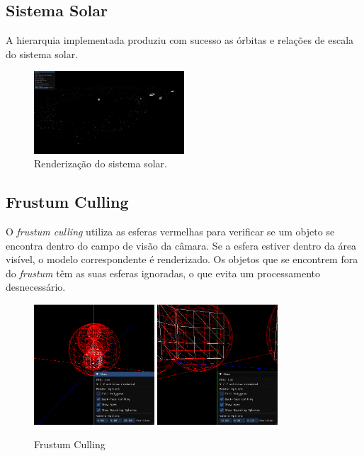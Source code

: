\documentclass[12pt, a4paper]{article}
\begin{document}
\subsection{Sistema Solar}

A hierarquia implementada produziu com sucesso as órbitas e relações de escala do sistema solar.

\begin{figure}[H]
    \centering
    \includegraphics[width=0.5\textwidth]{res/phase2/results/SolarSystem.png}
    \caption{Renderização do sistema solar.}
\end{figure}

\subsection{Frustum Culling}

O \textit{frustum culling} utiliza as esferas vermelhas para verificar se um objeto
se encontra dentro do campo de visão da câmara. Se a esfera estiver dentro da área visível, o
modelo correspondente é renderizado. Os objetos que se encontrem fora do \textit{frustum} têm as
suas esferas ignoradas, o que evita um processamento desnecessário.

\begin{figure}[H]
    \begin{adjustwidth}{-2cm}{-2cm}
        \centering
        \includegraphics[width=0.4\textwidth]{res/phase2/results/FrustumCulling.png}
        \includegraphics[width=0.4\textwidth]{res/phase2/results/FrustumCullingpt2.png}
        \caption{Frustum Culling}
    \end{adjustwidth}
\end{figure}
\end{document}

